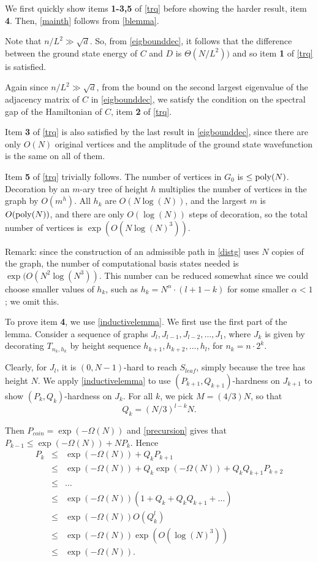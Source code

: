 \documentclass[letterpaper,onecolumn]{quantumarticle}
\newcommand{\be}{\begin{equation}}
\newcommand{\ee}{\end{equation}}
\newcommand{\poly}{{\rm poly}}
\newcommand{\Pbias}{P_{coin}}
\newcommand{\glen}{L}
\begin{document}
We first quickly show items {\bf 1-3,5} of \cref{trq} before showing the harder result, item {\bf 4}.  Then, \cref{mainth} follows from \cref{blemma}.

Note that $n/\glen^2\gg\sqrt{d}$.  So,
from \cref{eigbounddec}, it follows that the 
difference between the ground state energy of $C$ and $D$ is $\Theta(N/L^2))$ and so item {\bf 1} of \cref{trq} is satisfied.

Again since $n/\glen^2\gg\sqrt{d}$, from the bound on the second largest eigenvalue of the adjacency matrix of $C$ in \cref{eigbounddec}, we satisfy the condition on the spectral gap of the Hamiltonian of $C$, item {\bf 2} of \cref{trq}.

Item {\bf 3} of \cref{trq} is also satisfied by the last result in \cref{eigbounddec}, since there are only $O(N)$ original vertices and the amplitude of the ground state wavefunction is the same on all of them.


Item {\bf 5} of \cref{trq} trivially follows.  The number of vertices in $G_0$ is $\leq \poly(N)$.  Decoration by an $m$-ary tree of height $h$ multiplies the number of vertices in the graph by $O(m^h)$.  All $h_k$ are $O(N \log(N))$, and the largest $m$ is $O(\poly(N))$, and there are only $O(\log(N))$ steps of decoration, so the total number of vertices is $\exp(O(N \log(N)^3))$. 

Remark: since the construction of an admissible path in \cref{distg} uses $N$ copies of the graph, the number of computational basis states needed is $\exp(O(N^2 \log(N^3))$.  This number can be reduced somewhat since we could choose smaller values of $h_k$, such as $h_k=N^\alpha \cdot (l+1-k)$ for some smaller $\alpha<1$; we omit this.

To prove item {\bf 4}, we use \cref{inductivelemma}.
We first use the first part of the lemma.
Consider a sequence of graphs $J_l,J_{l-1},J_{l-2},\ldots,J_1$, where $J_k$ is given by decorating
$T_{n_k,h_k}$ by height sequence $h_{k+1},h_{k+2},\ldots,h_l$, for $n_k=n \cdot 2^k$.

Clearly, for $J_l$, it is $(0,N-1)$-hard to reach $S_{leaf}$, simply because the tree has height $N$.
We apply 
\cref{inductivelemma} to use $(P_{k+1},Q_{k+1})$-hardness on $J_{k+1}$ to show $(P_{k},Q_{k})$-hardness on $J_{k}$.
For all $k$, we pick $M=(4/3)N$, so that
\be
\label{Qk}
Q_k=(N/3)^{l-k} N.
\ee

Then $\Pbias=\exp(-\Omega(N))$ and
\cref{precursion}
gives that $P_{k-1}\leq \exp(-\Omega(N))+N P_k$.
Hence
\begin{eqnarray}
P_k &\leq & \exp(-\Omega(N))+Q_k P_{k+1} \\ \nonumber
&\leq & \exp(-\Omega(N))+Q_k \exp(-\Omega(N))+Q_k Q_{k+1} P_{k+2} \\ \nonumber
& \leq & \ldots \\ \nonumber
&\leq & \exp(-\Omega(N)) (1+Q_k+Q_k Q_{k+1}+\ldots) \\ \nonumber
&\leq & \exp(-\Omega(N)) O(Q_k^l) \\ \nonumber
& \leq & \exp(-\Omega(N)) \exp(O(\log(N)^3)) \\ \nonumber
& \leq & \exp(-\Omega(N)).
\end{eqnarray}
\end{document}
